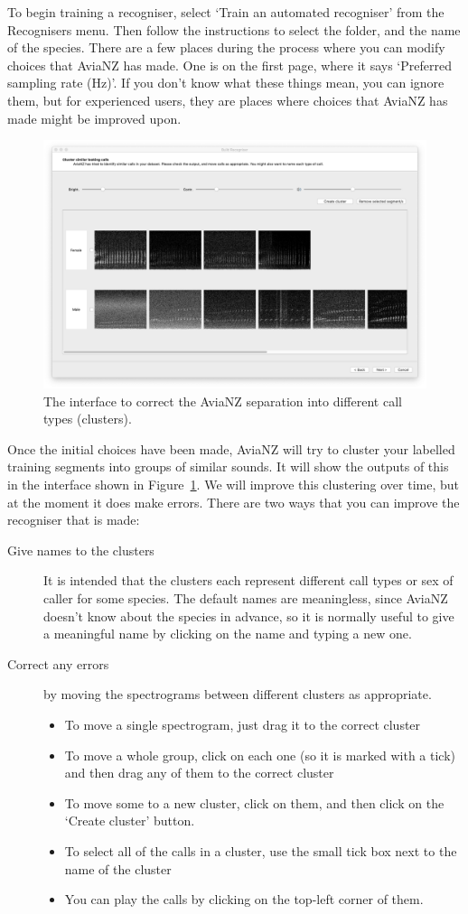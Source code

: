 \documentclass{article}
\begin{document}
To begin training a recogniser, select `Train an automated recogniser' from the Recognisers menu. Then follow the instructions to select the folder, and the name of the species. There are a few places during the process where you can modify choices that AviaNZ has made. One is on the first page, where it says `Preferred sampling rate (Hz)'. If you don't know what these things mean, you can ignore them, but for experienced users, they are places where choices that AviaNZ has made might be improved upon. 

    \begin{figure}[h]
    \centering
    \includegraphics[width=.6\textwidth]{Figs/Wizard_cluster}
    \caption{The interface to correct the AviaNZ separation into different call types (clusters).}
    \label{fig:clusters}
    \end{figure}
    
Once the initial choices have been made, AviaNZ will try to cluster your labelled training segments into groups of similar sounds. It will show the outputs of this in the interface shown in Figure~\ref{fig:clusters}. We will improve this clustering over time, but at the moment it does make errors. There are two ways that you can improve the recogniser that is made:

\begin{description}
\item[Give names to the clusters] It is intended that the clusters each represent different call types or sex of caller for some species. The default names are meaningless, since AviaNZ doesn't know about the species in advance, so it is normally useful to give a meaningful name by clicking on the name and typing a new one. 

\item[Correct any errors] by moving the spectrograms between different clusters as appropriate. 
\begin{itemize}
\item To move a single spectrogram, just drag it to the correct cluster
\item To move a whole group, click on each one (so it is marked with a tick) and then drag any of them to the correct cluster
\item To move some to a new cluster, click on them, and then click on the `Create cluster' button. 
\item To select all of the calls in a cluster, use the small tick box next to the name of the cluster
\item You can play the calls by clicking on the top-left corner of them.
\end{itemize}
\end{description}
\end{document}
